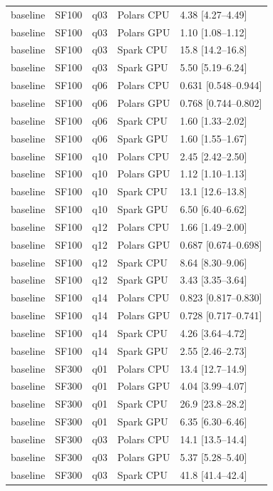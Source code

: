 \begin{longtable}{lllll}
baseline & SF100 & q03 & Polars CPU & 4.38 [4.27--4.49] \\
baseline & SF100 & q03 & Polars GPU & 1.10 [1.08--1.12] \\
baseline & SF100 & q03 & Spark CPU & 15.8 [14.2--16.8] \\
baseline & SF100 & q03 & Spark GPU & 5.50 [5.19--6.24] \\
baseline & SF100 & q06 & Polars CPU & 0.631 [0.548--0.944] \\
baseline & SF100 & q06 & Polars GPU & 0.768 [0.744--0.802] \\
baseline & SF100 & q06 & Spark CPU & 1.60 [1.33--2.02] \\
baseline & SF100 & q06 & Spark GPU & 1.60 [1.55--1.67] \\
baseline & SF100 & q10 & Polars CPU & 2.45 [2.42--2.50] \\
baseline & SF100 & q10 & Polars GPU & 1.12 [1.10--1.13] \\
baseline & SF100 & q10 & Spark CPU & 13.1 [12.6--13.8] \\
baseline & SF100 & q10 & Spark GPU & 6.50 [6.40--6.62] \\
baseline & SF100 & q12 & Polars CPU & 1.66 [1.49--2.00] \\
baseline & SF100 & q12 & Polars GPU & 0.687 [0.674--0.698] \\
baseline & SF100 & q12 & Spark CPU & 8.64 [8.30--9.06] \\
baseline & SF100 & q12 & Spark GPU & 3.43 [3.35--3.64] \\
baseline & SF100 & q14 & Polars CPU & 0.823 [0.817--0.830] \\
baseline & SF100 & q14 & Polars GPU & 0.728 [0.717--0.741] \\
baseline & SF100 & q14 & Spark CPU & 4.26 [3.64--4.72] \\
baseline & SF100 & q14 & Spark GPU & 2.55 [2.46--2.73] \\
baseline & SF300 & q01 & Polars CPU & 13.4 [12.7--14.9] \\
baseline & SF300 & q01 & Polars GPU & 4.04 [3.99--4.07] \\
baseline & SF300 & q01 & Spark CPU & 26.9 [23.8--28.2] \\
baseline & SF300 & q01 & Spark GPU & 6.35 [6.30--6.46] \\
baseline & SF300 & q03 & Polars CPU & 14.1 [13.5--14.4] \\
baseline & SF300 & q03 & Polars GPU & 5.37 [5.28--5.40] \\
baseline & SF300 & q03 & Spark CPU & 41.8 [41.4--42.4] \\

\end{longtable}
